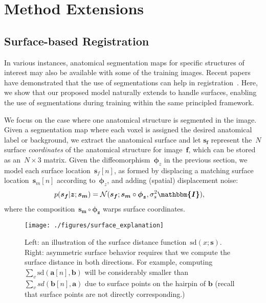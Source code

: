 \documentclass{article}
\newcommand{\bs}{\boldsymbol{s}}
\newcommand{\ba}{\boldsymbol{a}}
\newcommand{\bb}{\boldsymbol{b}}
\newcommand{\bphi}{\boldsymbol{\phi}}
\newcommand{\surfdist}{\text{sd}}
\newcommand{\bz}{\boldsymbol{z}}
\newcommand{\bmoving}{\boldsymbol{m}}
\newcommand{\bfixed}{\boldsymbol{f}}
\newcommand{\citep}{\cite}
\begin{document}
\section{Method Extensions}


\subsection{Surface-based Registration}



In various instances, anatomical segmentation maps for specific structures of interest may also be available with some of the training images. Recent papers have demonstrated that the use of segmentations can help in registration~\citep{balakrishnan2019,hu2018label}. Here, we show that our proposed model naturally extends to handle surfaces, enabling the use of segmentations during training within the same principled framework. 

We focus on the case where one anatomical structure is segmented in the image. Given a segmentation map where each voxel is assigned the desired anatomical label or background, we extract the anatomical surface and let $\bs_{\bfixed}$ represent the~$N$ surface \textit{coordinates} of the anatomical structure for image~$\bfixed$, which can be stored as an~$N \times 3$ matrix. Given the diffeomorphism~$\bphi_z$ in the previous section, we model each surface location~$\bs_f[n]$, as formed by displacing a matching surface location~$\bs_m[n]$ according to~$\bphi_z$, and adding (spatial) displacement noise:
\begin{align}
p(\bs_{\bfixed} | \bz ; \bs_{\bmoving}) &= \mathcal{N}(\bs_{\bfixed} ; \bs_{\bmoving} \circ \bphi_{\bz}, \sigma_s^2\boldsymbol{\mathbbm{I}}),  \label{eq:likelihood-surfaces}
\end{align}
where the composition~$\bs_{\bmoving} \circ \bphi_{\bz}$ warps surface coordinates. 


\begin{figure}[t!]
	\centering
	\texttt{[image: ./figures/surface\_explanation]}
	\hfill
	\vspace{-0.75cm}
	\caption{\color{blue} Left: an illustration of the surface distance function~$\surfdist(x;\bs)$. Right: asymmetric surface behavior requires that we compute the surface distance in both directions. For example, computing~$\sum_v \surfdist(\ba[n], \bb)$ will be considerably smaller than~$\sum_v sd(\bb[n], \ba)$ due to surface points on the hairpin of $\bb$ (recall that surface points are not directly corresponding.)}
	\label{fig:surface_explanation}
\end{figure}
\end{document}
